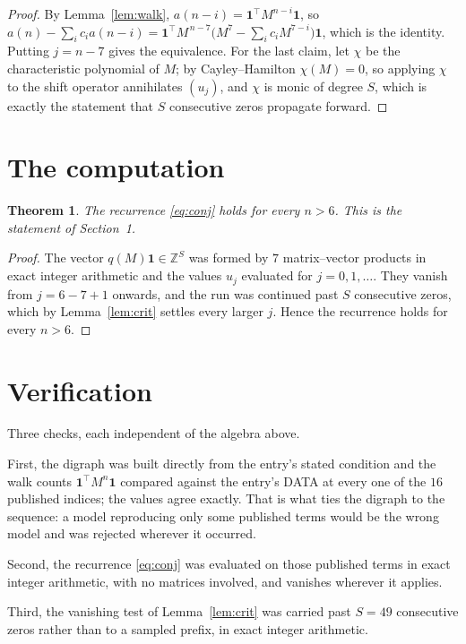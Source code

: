 \documentclass[11pt,a4paper]{article}
\theoremstyle{plain}
\newtheorem{theorem}{Theorem}
\theoremstyle{definition}
\begin{document}
\begin{proof}
By Lemma~\ref{lem:walk}, $a(n-i)=\mathbf{1}^{\!\top}M^{n-i}\mathbf{1}$, so
$a(n)-\sum_i c_i a(n-i)
=\mathbf{1}^{\!\top}M^{\,n-7}\bigl(M^{7}-\sum_i c_i M^{7-i}\bigr)
\mathbf{1}$, which is the identity. Putting $j=n-7$ gives the equivalence. For the
last claim, let $\chi$ be the characteristic polynomial of $M$; by Cayley--Hamilton
$\chi(M)=0$, so applying $\chi$ to the shift operator annihilates $(u_j)$, and $\chi$ is
monic of degree $S$, which is exactly the statement that $S$ consecutive zeros propagate
forward.
\end{proof}

\section{The computation}

\begin{theorem}
The recurrence \eqref{eq:conj} holds for every $n>6$. This is the statement of
Section~1.
\end{theorem}

\begin{proof}
The vector $q(M)\mathbf{1}\in\mathbb{Z}^{S}$ was formed by $7$ matrix--vector
products in exact integer arithmetic and the values $u_j$ evaluated for
$j=0,1,\dots$. They vanish from $j=6-7+1$ onwards, and the run was continued past
$S$ consecutive zeros, which by Lemma~\ref{lem:crit} settles every larger $j$. Hence the
recurrence holds for every $n>6$.
\end{proof}

\section{Verification}

Three checks, each independent of the algebra above.

First, the digraph was built directly from the entry's stated condition and the walk counts
$\mathbf{1}^{\!\top}M^{n}\mathbf{1}$ compared against the entry's DATA at every one of
the $16$ published indices; the values agree exactly. That is what ties the digraph to
the sequence: a model reproducing only some published terms would be the wrong model and
was rejected wherever it occurred.

Second, the recurrence \eqref{eq:conj} was evaluated on those published terms in exact
integer arithmetic, with no matrices involved, and vanishes wherever it applies.

Third, the vanishing test of Lemma~\ref{lem:crit} was carried past $S=49$ consecutive
zeros rather than to a sampled prefix, in exact integer arithmetic.
\end{document}
